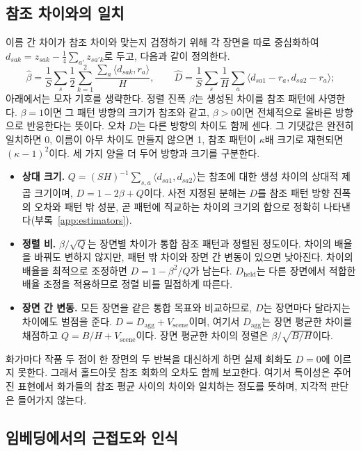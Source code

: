 \documentclass[10pt]{article}
\newcommand{\ip}[2]{\langle #1,#2\rangle}
\begin{document}
\subsection{참조 차이와의 일치}\label{sec:agreement-method}

이름 간 차이가 참조 차이와 맞는지 검정하기 위해 각 장면을 따로 중심화하여
$d_{sak}=z_{sak}-\frac14\sum_{a'}z_{sa'k}$로 두고, 다음과 같이 정의한다.
\begin{equation}
\widehat\beta=\frac1S\sum_s\frac{1}{2}\sum_{k=1}^2\frac{\sum_a\ip{d_{sak}}{r_a}}{H},\qquad
\widehat D=\frac1S\sum_s\frac1H\sum_a\ip{d_{sa1}-r_a}{d_{sa2}-r_a};
\label{eq:beta-d}
\end{equation}
아래에서는 모자 기호를 생략한다. 정렬 진폭 $\beta$는 생성된 차이를 참조 패턴에 사영한다. $\beta=1$이면
그 패턴 방향의 크기가 참조와 같고, $\beta>0$이면 전체적으로 올바른 방향으로 반응한다는 뜻이다. 오차
$D$는 다른 방향의 차이도 함께 센다. 그 기댓값은 완전히 일치하면 0, 이름이 아무 차이도 만들지 않으면 1,
참조 패턴이 $\kappa$배 크기로 재현되면 $(\kappa-1)^2$이다. 세 가지 양을 더 두어 방향과 크기를 구분한다.
\begin{itemize}
\item \textbf{상대 크기.} $Q=(SH)^{-1}\sum_{s,a}\ip{d_{sa1}}{d_{sa2}}$는 참조에 대한 생성 차이의 상대적
제곱 크기이며, $D=1-2\beta+Q$이다. 사전 지정된 분해는 $D$를 참조 패턴 방향 진폭의 오차와 패턴 밖 성분,
곧 패턴에 직교하는 차이의 크기의 합으로 정확히 나타낸다(부록~\ref{app:estimators}).
\item \textbf{정렬 비.} $\beta/\sqrt{Q}$는 장면별 차이가 통합 참조 패턴과 정렬된 정도이다. 차이의 배율을
바꿔도 변하지 않지만, 패턴 밖 차이와 장면 간 변동이 있으면 낮아진다. 차이의 배율을 최적으로 조정하면
$D=1-\beta^2/Q$가 남는다. $D_{\mathrm{held}}$는 다른 장면에서 적합한 배율 조정을 적용하므로 정렬 비를
밀접하게 따른다.
\item \textbf{장면 간 변동.} 모든 장면을 같은 통합 목표와 비교하므로, $D$는 장면마다 달라지는 차이에도
벌점을 준다. $D=D_{\mathrm{agg}}+V_{\mathrm{scene}}$이며, 여기서 $D_{\mathrm{agg}}$는 장면 평균한 차이를
채점하고 $Q=B/H+V_{\mathrm{scene}}$이다. 장면 평균한 차이의 정렬은 $\beta/\sqrt{B/H}$이다.
\end{itemize}
화가마다 작품 두 점이 한 장면의 두 반복을 대신하게 하면 실제 회화도 $D=0$에 이르지 못한다. 그래서
홀드아웃 참조 회화의 오차도 함께 보고한다. 여기서 특이성은 주어진 표현에서 화가들의 참조 평균 사이의
차이와 일치하는 정도를 뜻하며, 지각적 판단은 들어가지 않는다.

\subsection{임베딩에서의 근접도와 인식}\label{sec:proximity}
\end{document}
